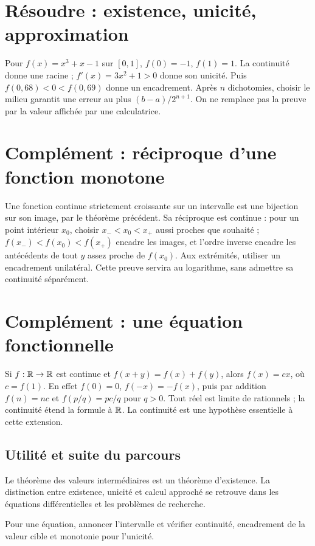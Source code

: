 \documentclass[../cours_tle.tex]{subfiles}
\begin{document}
\section{Résoudre : existence, unicité, approximation}
Pour $f(x)=x^3+x-1$ sur $[0,1]$, $f(0)=-1$, $f(1)=1$. La continuité donne une racine ; $f'(x)=3x^2+1>0$ donne son unicité. Puis $f(0{,}68)<0<f(0{,}69)$ donne un encadrement.
Après $n$ dichotomies, choisir le milieu garantit une erreur au plus $(b-a)/2^{n+1}$.
On ne remplace pas la preuve par la valeur affichée par une calculatrice.
\section{Complément : réciproque d'une fonction monotone}
Une fonction continue strictement croissante sur un intervalle est une bijection sur son image, par le théorème précédent. Sa réciproque est continue : pour un point intérieur $x_0$, choisir $x_-<x_0<x_+$ aussi proches que souhaité ;
$f(x_-)<f(x_0)<f(x_+)$ encadre les images, et l'ordre inverse encadre les antécédents de tout $y$ assez proche de $f(x_0)$. Aux extrémités, utiliser un encadrement unilatéral.
Cette preuve servira au logarithme, sans admettre sa continuité séparément.
\section{Complément : une équation fonctionnelle}
Si $f:\mathbb{R}\to\mathbb{R}$ est continue et $f(x+y)=f(x)+f(y)$, alors $f(x)=cx$, où $c=f(1)$.
En effet $f(0)=0$, $f(-x)=-f(x)$, puis par addition $f(n)=nc$ et $f(p/q)=pc/q$ pour $q>0$. Tout réel est limite de rationnels ; la continuité étend la formule à $\mathbb{R}$. La continuité est une hypothèse essentielle à cette extension.
\begin{finchapitre}
\section{Utilité et suite du parcours}
Le théorème des valeurs intermédiaires est un théorème d'existence. La distinction entre existence, unicité et calcul approché se retrouve dans les équations différentielles et les problèmes de recherche.
\begin{retenir}
Pour une équation, annoncer l'intervalle et vérifier continuité, encadrement de la valeur cible et monotonie pour l'unicité.
\end{retenir}
\end{finchapitre}
\end{document}
